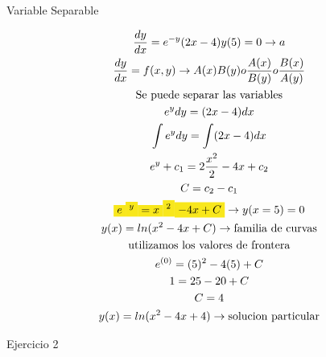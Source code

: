 \documentclass{article}
\begin{document}
Variable Separable


\begin{gather*}
\frac{dy}{dx} = e^{-y}(2x-4)    y(5) =0  \rightarrow  a \\
\frac{dy}{dx}  = f(x,y)  \rightarrow  A(x)B(y) o \frac{A(x)}{B(y)} o \frac{B(x)}{A(y)} \\
\text{Se puede separar las variables} \\
e^{y}dy = (2x-4)dx \\
\int e^{y}dy = \int (2x-4)dx \\
e^{y}+c_{1}= 2\frac{x^{2}}{2} - 4x +c_{2} \\
C = c_{2}-c_{1} \\
\text{\colorbox[RGB]{248,231,28}{$e$}}\text{\colorbox[RGB]{248,231,28}{$^{y}$}}\text{\colorbox[RGB]{248,231,28}{$ = x$}}\text{\colorbox[RGB]{248,231,28}{$^{2}$}}\text{\colorbox[RGB]{248,231,28}{$-4x+C$}}    \rightarrow  y(x=5) =0 \\
y(x) = ln(x^{2}-4x+C)  \rightarrow \text{familia de curvas} \\
\text{utilizamos los valores de frontera} \\
e^{(0)} = (5)^{2}-4(5)+C \\
1 = 25 - 20 + C \\
C = 4 \\
y(x) = ln(x^{2}-4x+4)  \rightarrow \text{solucion particular}
\end{gather*}


Ejercicio 2
\end{document}
